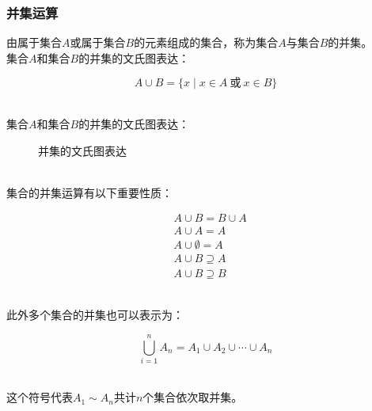 \documentclass[UTF8]{ctexart}
\begin{document}
\newpage

\subsubsection{并集运算}
    由属于集合$A$或属于集合$B$的元素组成的集合，称为集合$A$与集合$B$的并集。\\[3mm]
    集合$A$和集合$B$的并集的文氏图表达：
    \begin{large}
        \begin{equation*}
            A\cup B=\big\{ x\mid x\in A~\text{或}~x\in B\big\}
        \end{equation*}
    \end{large}\\
    集合$A$和集合$B$的并集的文氏图表达：
    \begin{figure}[h]
        \begin{center}
            \caption{并集的文氏图表达}
        \end{center}
    \end{figure}\\
    集合的并集运算有以下重要性质：
    \begin{large}
        \begin{align*}
            &A\cup B=B\cup A\\[3mm]
            &A\cup A=A\\[3mm]
            &A\cup \emptyset=A\\[3mm]
            &A\cup B\supseteq A\\[3mm]
            &A\cup B\supseteq B
        \end{align*}
    \end{large}\\
    此外多个集合的并集也可以表示为：
    \begin{large}
        \begin{equation*}
            \bigcup_{i=1}^{n}A_n=A_1\cup A_2\cup\cdots\cup A_n
        \end{equation*}
    \end{large}\\
    这个符号代表$A_1\sim A_n$共计$n$个集合依次取并集。
\end{document}
